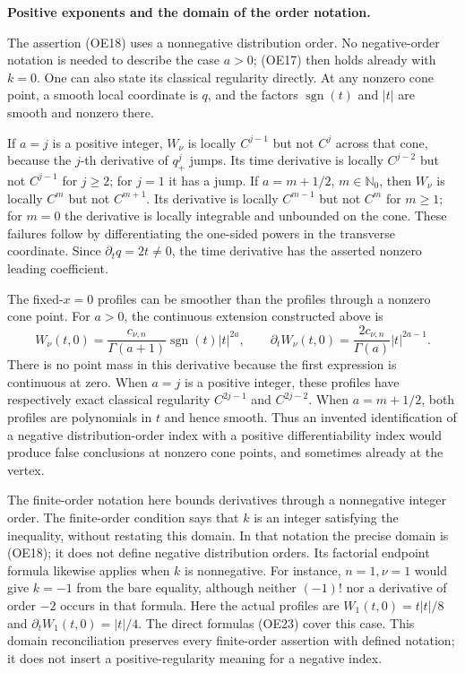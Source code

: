 \documentclass[
  11pt,
]{article}
\begin{document}
\textbf{Positive exponents and the domain of the order notation.}

The assertion (OE18) uses a nonnegative distribution order. No
negative-order notation is needed to describe the case \(a>0\); (OE17)
then holds already with \(k=0\). One can also state its classical
regularity directly. At any nonzero cone point, a smooth local
coordinate is \(q\), and the factors \(\operatorname{sgn}(t)\) and
\(|t|\) are smooth and nonzero there.

If \(a=j\) is a positive integer, \(W_\nu\) is locally \(C^{j-1}\) but
not \(C^j\) across that cone, because the \(j\)-th derivative of
\(q_+^j\) jumps. Its time derivative is locally \(C^{j-2}\) but not
\(C^{j-1}\) for \(j\geq2\); for \(j=1\) it has a jump. If \(a=m+1/2\),
\(m\in\mathbb N_0\), then \(W_\nu\) is locally \(C^m\) but not
\(C^{m+1}\). Its derivative is locally \(C^{m-1}\) but not \(C^m\) for
\(m\geq1\); for \(m=0\) the derivative is locally integrable and
unbounded on the cone. These failures follow by differentiating the
one-sided powers in the transverse coordinate. Since
\(\partial_tq=2t\ne0\), the time derivative has the asserted nonzero
leading coefficient.

The fixed-\(x=0\) profiles can be smoother than the profiles through a
nonzero cone point. For \(a>0\), the continuous extension constructed
above is \[
 W_\nu(t,0)=\frac{c_{\nu,n}}{\Gamma(a+1)}
                      \operatorname{sgn}(t)|t|^{2a},
 \qquad
 \partial_tW_\nu(t,0)=\frac{2c_{\nu,n}}{\Gamma(a)}|t|^{2a-1}.
 \tag{OE23}
\] There is no point mass in this derivative because the first
expression is continuous at zero. When \(a=j\) is a positive integer,
these profiles have respectively exact classical regularity \(C^{2j-1}\)
and \(C^{2j-2}\). When \(a=m+1/2\), both profiles are polynomials in
\(t\) and hence smooth. Thus an invented identification of a negative
distribution-order index with a positive differentiability index would
produce false conclusions at nonzero cone points, and sometimes already
at the vertex.

The finite-order notation here bounds derivatives through a nonnegative
integer order. The finite-order condition says that \(k\) is an integer
satisfying the inequality, without restating this domain. In that
notation the precise domain is (OE18); it does not define negative
distribution orders. Its factorial endpoint formula likewise applies
when \(k\) is nonnegative. For instance, \(n=1,\nu=1\) would give
\(k=-1\) from the bare equality, although neither \((-1)!\) nor a
derivative of order \(-2\) occurs in that formula. Here the actual
profiles are \(W_1(t,0)=t|t|/8\) and \(\partial_tW_1(t,0)=|t|/4\). The
direct formulas (OE23) cover this case. This domain reconciliation
preserves every finite-order assertion with defined notation; it does
not insert a positive-regularity meaning for a negative index.
\end{document}
